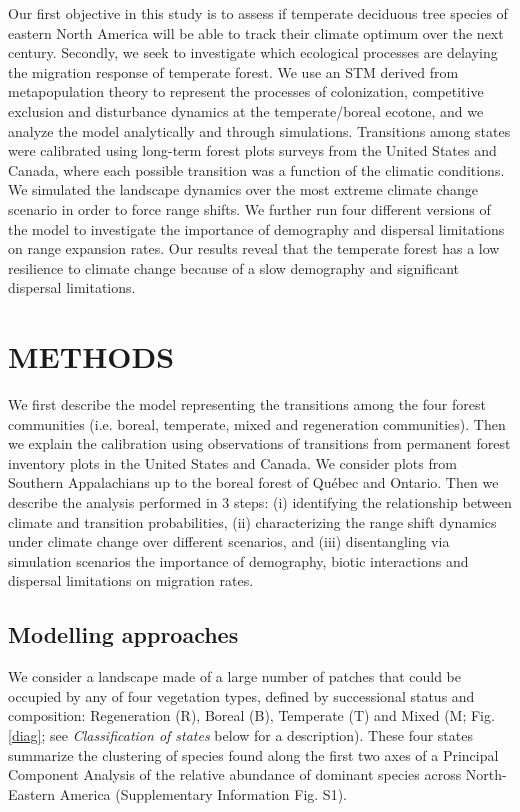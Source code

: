 Our first objective in this study is to assess if temperate deciduous tree species of eastern North
America will be able to track their climate optimum over the next century. Secondly, we seek to
investigate which ecological processes are delaying the migration response of temperate forest. We
use an STM derived from metapopulation theory to represent the processes of colonization,
competitive exclusion and disturbance dynamics at the temperate/boreal ecotone, and we analyze the
model analytically and through simulations. Transitions among states were
calibrated using long-term forest plots surveys from the United States and Canada, where each
possible transition was a function of the climatic conditions. We simulated the landscape dynamics
over the most extreme climate change scenario \citep[RCP 8.5,][]{Taylor2012} in order to force range
shifts. We further run four different versions of the model to investigate the importance of
demography and dispersal limitations on range expansion rates. Our results reveal that the temperate
forest has a low resilience to climate change because of a slow demography and significant dispersal
limitations.

\cleardoublepage

\section*{\uppercase{Methods}}

We first describe the model representing the transitions among the four forest communities (i.e. boreal, temperate, mixed and regeneration communities). Then we explain the calibration using observations of transitions from permanent forest inventory plots in the United States and Canada. We consider plots from Southern Appalachians up to the boreal forest of Québec and Ontario.
Then we describe the analysis performed in 3 steps: (i) identifying the relationship between climate and transition probabilities, (ii) characterizing the range shift dynamics under climate change over different scenarios, and (iii) disentangling via simulation scenarios the importance of demography, biotic interactions and dispersal limitations on migration rates.

\subsection*{Modelling approaches}

We consider a landscape made of a large number of patches that could be occupied by any of four
vegetation types, defined by successional status and composition: Regeneration (R), Boreal (B),
Temperate (T) and Mixed (M; Fig.\ref{diag}; see \emph{Classification of states} below for a
description). These four states summarize the clustering of species found along the first two axes
of a Principal Component Analysis of the relative abundance of dominant species across North-Eastern
America (Supplementary Information Fig. S1).

